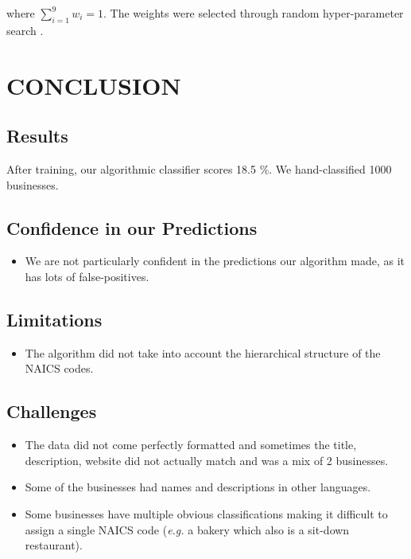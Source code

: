 \documentclass[letterpaper, 10 pt, conference]{IEEEtran}
\begin{document}
where $\sum_{i=1}^9 w_i=1$. The weights were selected through random hyper-parameter search \cite{random}.



\section{CONCLUSION}

\subsection{Results}

After training, our algorithmic classifier scores 18.5 \%. We hand-classified 1000 businesses.

\subsection{Confidence in our Predictions}

\begin{itemize}
\item We are not particularly confident in the predictions our algorithm made, as it has lots of false-positives.
\end{itemize}


\subsection{Limitations}
\begin{itemize}
\item The algorithm did not take into account the hierarchical structure of the NAICS codes.
\end{itemize}

\subsection{Challenges}
\begin{itemize}

\item The data did not come perfectly formatted and sometimes the title, description, website did not actually match and was a mix of 2 businesses.
\item Some of the businesses had names and descriptions in other languages.
\item Some businesses have multiple obvious classifications making it difficult to assign a single NAICS code (\textit{e.g.} a bakery which also is a sit-down restaurant).

\end{itemize}
\end{document}
